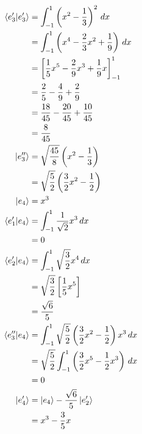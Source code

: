 \documentclass{article}
\begin{document}
\begin{align*}
  \braket{e_3' | e_3'} & = \int_{-1}^1 \left( x^2 - \frac{1}{3} \right)^2 \,d x                                  \\
                       & = \int_{-1}^1 \left( x^4 - \frac{2}{3} x^2 + \frac{1}{9} \right) \,d x                  \\
                       & = \left[ \frac{1}{5} x^5 - \frac{2}{9} x^3 + \frac{1}{9} x \right]_{-1}^1               \\
                       & = \frac{2}{5} - \frac{4}{9} + \frac{2}{9}                                               \\
                       & = \frac{18}{45} - \frac{20}{45} + \frac{10}{45}                                         \\
                       & = \frac{8}{45}                                                                          \\
  \ket{e_3''}          & = \sqrt{\frac{45}{8}} \left( x^2 - \frac{1}{3} \right)                                  \\
                       & = \sqrt{\frac{5}{2}} \left( \frac{3}{2} x^2 - \frac{1}{2} \right)                       \\
  \ket{e_4}            & = x^3                                                                                   \\
  \braket{e_1' | e_4}  & = \int_{-1}^1 \frac{1}{\sqrt{2}} x^3 \,d x                                              \\
                       & = 0                                                                                     \\
  \braket{e_2' | e_4}  & = \int_{-1}^1 \sqrt{\frac{3}{2}} x^4 \,d x                                              \\
                       & = \sqrt{\frac{3}{2}} \left[ \frac{1}{5} x^5 \right]                                     \\
                       & = \frac{\sqrt{6}}{5}                                                                    \\
  \braket{e_3'' | e_4} & = \int_{-1}^1 \sqrt{\frac{5}{2}} \left( \frac{3}{2} x^2 - \frac{1}{2} \right) x^3 \,d x \\
                       & = \sqrt{\frac{5}{2}} \int_{-1}^1 \left( \frac{3}{2} x^5 - \frac{1}{2} x^3 \right) \,d x \\
                       & = 0                                                                                     \\
  \ket{e_4'}           & = \ket{e_4} - \frac{\sqrt{6}}{5} \ket{e_2'}                                             \\
                       & = x^3 - \frac{3}{5} x
\end{align*}
\end{document}
